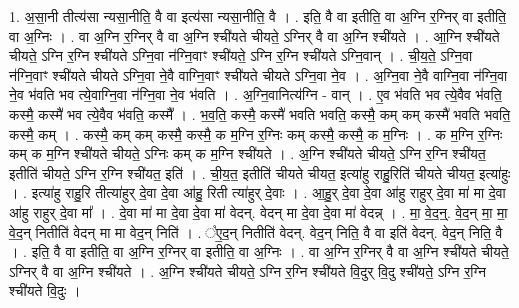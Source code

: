 \documentclass[17pt]{extarticle}
\begin{document}
1. अ॒सा॒नी तीत्य॑सा न्यसा॒नीति॒ वै वा इत्य॑सा न्यसा॒नीति॒ वै । . इति॒ वै वा इतीति॒ वा अ॒ग्नि र॒ग्निर् वा इतीति॒ वा अ॒ग्निः । . वा अ॒ग्नि र॒ग्निर् वै वा अ॒ग्नि श्ची॑यते चीयते॒ ऽग्निर् वै वा अ॒ग्नि श्ची॑यते । . आ॒ग्नि श्ची॑यते चीयते॒ ऽग्नि र॒ग्नि श्ची॑यते ऽग्नि॒वा न॑ग्नि॒वाꣳ श्ची॑यते॒ ऽग्नि र॒ग्नि श्ची॑यते ऽग्नि॒वान् । . ची॒य॒ते॒ ऽग्नि॒वा न॑ग्नि॒वाꣳ श्ची॑यते चीयते ऽग्नि॒वा ने॒वै वाग्नि॒वाꣳ श्ची॑यते चीयते ऽग्नि॒वा ने॒व । . अ॒ग्नि॒वा ने॒वै वाग्नि॒वा न॑ग्नि॒वा ने॒व भ॑वति भव त्ये॒वाग्नि॒वा न॑ग्नि॒वा ने॒व भ॑वति । . अ॒ग्नि॒वानित्य॑ग्नि - वान् । . ए॒व भ॑वति भव त्ये॒वैव भ॑वति॒ कस्मै॒ कस्मै॑ भव त्ये॒वैव भ॑वति॒ कस्मै᳚ । . भ॒व॒ति॒ कस्मै॒ कस्मै॑ भवति भवति॒ कस्मै॒ कम् कम् कस्मै॑ भवति भवति॒ कस्मै॒ कम् । . कस्मै॒ कम् कम् कस्मै॒ कस्मै॒ क म॒ग्नि र॒ग्निः कम् कस्मै॒ कस्मै॒ क म॒ग्निः । . क म॒ग्नि र॒ग्निः कम् क म॒ग्नि श्ची॑यते चीयते॒ ऽग्निः कम् क म॒ग्नि श्ची॑यते । . अ॒ग्नि श्ची॑यते चीयते॒ ऽग्नि र॒ग्नि श्ची॑यत॒ इतीति॑ चीयते॒ ऽग्नि र॒ग्नि श्ची॑यत॒ इति॑ । . ची॒य॒त॒ इतीति॑ चीयते चीयत॒ इत्या॑हु राहु॒रिति॑ चीयते चीयत॒ इत्या॑हुः । . इत्या॑हु राहु॒रि तीत्या॑हुर् दे॒वा दे॒वा आ॑हु॒ रिती त्या॑हुर् दे॒वाः । . आ॒हु॒र् दे॒वा दे॒वा आ॑हु राहुर् दे॒वा मा॑ मा दे॒वा आ॑हु राहुर् दे॒वा मा᳚ । . दे॒वा मा॑ मा दे॒वा दे॒वा मा॑ वेदन्. वेदन् मा दे॒वा दे॒वा मा॑ वेदन्न् । . मा॒ वे॒द॒न्॒. वे॒द॒न् मा॒ मा॒ वे॒द॒न् नितीति॑ वेदन् मा मा वेद॒न् निति॑ । . ꣡ए॒द॒न् नितीति॑ वेदन्. वेद॒न् निति॒ वै वा इति॑ वेदन्. वेद॒न् निति॒ वै । . इति॒ वै वा इतीति॒ वा अ॒ग्नि र॒ग्निर् वा इतीति॒ वा अ॒ग्निः । . वा अ॒ग्नि र॒ग्निर् वै वा अ॒ग्नि श्ची॑यते चीयते॒ ऽग्निर् वै वा अ॒ग्नि श्ची॑यते । . अ॒ग्नि श्ची॑यते चीयते॒ ऽग्नि र॒ग्नि श्ची॑यते वि॒दुर् वि॒दु श्ची॑यते॒ ऽग्नि र॒ग्नि श्ची॑यते वि॒दुः । \newline
\end{document}
